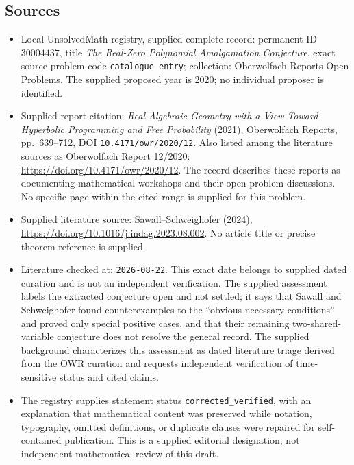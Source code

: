 \documentclass[11pt]{article}
\begin{document}
\subsection{Sources}
\begin{itemize}
\item Local UnsolvedMath registry, supplied complete record: permanent ID \(30004437\), title \emph{The Real-Zero Polynomial Amalgamation Conjecture}, exact source problem code \texttt{catalogue entry}; collection: Oberwolfach Reports Open Problems. The supplied proposed year is 2020; no individual proposer is identified.
\item Supplied report citation: \emph{Real Algebraic Geometry with a View Toward Hyperbolic Programming and Free Probability} (2021), Oberwolfach Reports, pp.\ 639--712, DOI \texttt{10.4171/owr/2020/12}. Also listed among the literature sources as Oberwolfach Report 12/2020: \url{https://doi.org/10.4171/owr/2020/12}. The record describes these reports as documenting mathematical workshops and their open-problem discussions. No specific page within the cited range is supplied for this problem.
\item Supplied literature source: Sawall--Schweighofer (2024), \url{https://doi.org/10.1016/j.indag.2023.08.002}. No article title or precise theorem reference is supplied.
\item Literature checked at: \texttt{2026-08-22}. This exact date belongs to supplied dated curation and is not an independent verification. The supplied assessment labels the extracted conjecture open and not settled; it says that Sawall and Schweighofer found counterexamples to the ``obvious necessary conditions'' and proved only special positive cases, and that their remaining two-shared-variable conjecture does not resolve the general record. The supplied background characterizes this assessment as dated literature triage derived from the OWR curation and requests independent verification of time-sensitive status and cited claims.
\item The registry supplies statement status \texttt{corrected\_verified}, with an explanation that mathematical content was preserved while notation, typography, omitted definitions, or duplicate clauses were repaired for self-contained publication. This is a supplied editorial designation, not independent mathematical review of this draft.
\end{itemize}
\end{document}
